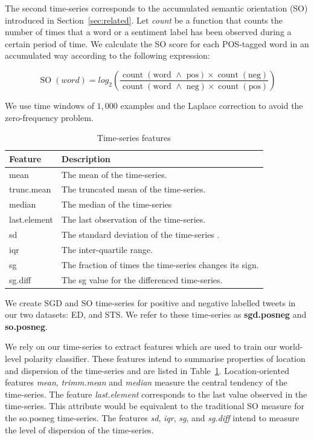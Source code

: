 \documentclass{sig-alternate}
\begin{document}
The second time-series corresponds to the accumulated semantic orientation (SO) introduced in Section~\ref{sec:related}. Let \emph{count} be a function that counts the number of times that a word or a sentiment label has been observed during a certain period of time. We calculate the SO score for each POS-tagged word in an accumulated way according to the following expression:   

\begin{equation}\label{eq:so}
 \operatorname{SO}(word) = log_2 \left( \frac{\operatorname{count}(\text{word $\wedge$ pos}) \times \operatorname{count}(\text{neg})}{\operatorname{count}(\text{word $\wedge$ neg}) \times \operatorname{count}(\text{pos})}\right)
\end{equation}


We use time windows of $1,000$ examples and the Laplace correction to avoid the zero-frequency problem. 


\begin{table}[htbp]
\footnotesize
\begin{center}
\begin{tabular}{l|l}
\hline
Feature & Description \\ \hline
mean &  The mean of the time-series. \\ 
trunc.mean &  The truncated mean of the time-series. \\ 
median &  The median of the time-series \\ 
last.element &  The last observation of the time-series.\\ 
sd &  The standard deviation of the time-series . \\ 
iqr &  The inter-quartile range. \\ 
sg &  The fraction of times the time-series changes its sign. \\ 
sg.diff &  The sg value for the  differenced time-series. \\ \hline
\end{tabular}
\end{center}
\caption{Time-series features}
\label{tab:feat}
\end{table}

We create SGD and SO time-series for positive and negative labelled tweets in our two datasets: ED, and STS. We refer to these time-series as \textbf{sgd.posneg} and \textbf{so.posneg}. 


We rely on our time-series to extract features which are used to train our world-level polarity classifier. These features intend to summarise properties of location and dispersion of the time-series and are listed in Table~\ref{tab:feat}. Location-oriented features \emph{mean}, \emph{trimm.mean} and \emph{median} measure the central tendency of the time-series. The feature \emph{last.element} corresponds to the last value observed in the time-series.  This attribute  would be equivalent to the traditional SO measure for the so.posneg time-series. The features \emph{sd}, \emph{iqr}, \emph{sg}, and \emph{sg.diff} intend to measure the level of dispersion of the time-series. 
\end{document}

